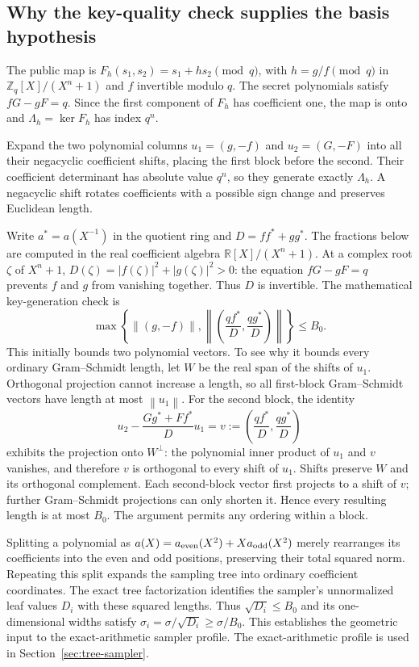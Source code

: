 \documentclass[11pt,a4paper]{article}
\newcommand{\Z}{\mathbb Z}
\newcommand{\R}{\mathbb R}
\newcommand{\norm}[1]{\left\lVert#1\right\rVert}
\theoremstyle{definition}
\theoremstyle{remark}
\numberwithin{equation}{section}
\begin{document}
\subsection{Why the key-quality check supplies the basis hypothesis}
\label{sec:key-quality}

The public map is $F_h(s_1,s_2)=s_1+hs_2\pmod q$, with
$h=g/f\pmod q$ in $\Z_q[X]/(X^n+1)$ and $f$ invertible modulo $q$.
The secret polynomials satisfy $fG-gF=q$. Since the first component of
$F_h$ has coefficient one, the map is onto and
$\Lambda_h=\ker F_h$ has index $q^n$.

Expand the two polynomial columns
$u_1=(g,-f)$ and $u_2=(G,-F)$ into all their negacyclic coefficient
shifts, placing the first block before the second. Their coefficient
determinant has absolute value $q^n$, so they generate exactly
$\Lambda_h$. A negacyclic shift rotates coefficients with a possible
sign change and preserves Euclidean length.

Write $a^*=a(X^{-1})$ in the quotient ring and $D=ff^*+gg^*$.
The fractions below are computed in the real coefficient algebra
$\R[X]/(X^n+1)$. At a complex root $\zeta$ of $X^n+1$,
$D(\zeta)=|f(\zeta)|^2+|g(\zeta)|^2>0$: the equation $fG-gF=q$
prevents $f$ and $g$ from vanishing together. Thus $D$ is invertible.
The mathematical key-generation check is
\[
 \max\left\{\norm{(g,-f)},
 \left\|\left(\frac{qf^*}{D},\frac{qg^*}{D}\right)\right\|\right\}
 \le B_0.
\]
This initially bounds two polynomial vectors. To see why it bounds
every ordinary Gram--Schmidt length, let $W$ be the real span of the
shifts of $u_1$. Orthogonal projection cannot increase a length, so all
first-block Gram--Schmidt vectors have length at most $\norm{u_1}$.
For the second block, the identity
\[
 u_2-\frac{Gg^*+Ff^*}{D}u_1
   =v:=\left(\frac{qf^*}{D},\frac{qg^*}{D}\right)
\]
exhibits the projection onto $W^\perp$: the polynomial inner product of
$u_1$ and $v$ vanishes, and therefore $v$ is orthogonal to every shift
of $u_1$. Shifts preserve $W$ and its orthogonal complement. Each
second-block vector first projects to a shift of $v$; further
Gram--Schmidt projections can only shorten it. Hence every resulting
length is at most $B_0$. The argument permits any ordering within a block.

Splitting a polynomial as $a(X)=a_{\rm even}(X^2)+X a_{\rm odd}(X^2)$ merely rearranges its coefficients into the even and odd positions, preserving their total squared norm. Repeating this split expands the sampling tree into ordinary coefficient coordinates. The exact tree factorization identifies the sampler's
unnormalized leaf values $D_i$ with these squared lengths. Thus
$\sqrt{D_i}\le B_0$ and its one-dimensional widths satisfy
$\sigma_i=\sigma/\sqrt{D_i}\ge\sigma/B_0$. This establishes the geometric
input to the exact-arithmetic sampler profile. The exact-arithmetic profile is used in Section~\ref{sec:tree-sampler}.
\end{document}
